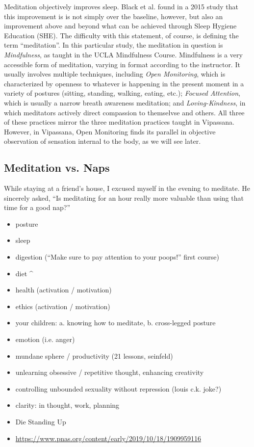 \documentclass[a4paper, amsfonts, amssymb, amsmath, reprint, showkeys, nofootinbib, twoside]{revtex4-1}
\begin{document}
Meditation objectively improves sleep. Black et al. found in a 2015 study that this
improvement is is not simply over the baseline, however, but also an improvement
above and beyond what can be achieved through Sleep
Hygiene Education (SHE). \cite{black2015} The difficulty with this statement, of
course, is defining the term ``meditation''. In this particular study, the meditation
in question is \textit{Mindfulness}, as taught in the UCLA Mindfulness
Course. \cite{uclamaps} Mindfulness is a very accessible form of meditation, varying
in format according to the instructor. It usually involves multiple techniques,
including \textit{Open Monitoring}, which is characterized by
openness to whatever is happening in the present moment in a variety of postures
(sitting, standing, walking, eating, etc.); \textit{Focused Attention}, which is
usually a narrow breath awareness meditation; and \textit{Loving-Kindness}, in which
meditators actively direct compassion to themselvse and others. All three of these
practices mirror the three meditation practices taught in Vipassana. However, in Vipassana, Open
Monitoring finds its parallel in objective observation of sensation internal to the
body, as we will see later.


\subsection{Meditation vs. Naps}

While staying at a friend's house, I excused myself in the evening to meditate. He
sincerely asked, ``Is meditating for an hour really more valuable than using that
time for a good nap?''


\begin{itemize}
  \item posture
  \item sleep
  \item digestion (``Make sure to pay attention to your poops!'' first course)
  \item diet ^
  \item health (activation / motivation)
  \item ethics (activation / motivation)
  \item your children: a. knowing how to meditate, b. cross-legged posture
  \item emotion (i.e. anger)
  \item mundane sphere / productivity (21 lessons, seinfeld)
  \item unlearning obsessive / repetitive thought, enhancing creativity
  \item controlling unbounded sexuality without repression (louis c.k. joke?)
  \item clarity: in thought, work, planning
  \item Die Standing Up
  \item \url{https://www.pnas.org/content/early/2019/10/18/1909959116}
\end{itemize}
\end{document}
